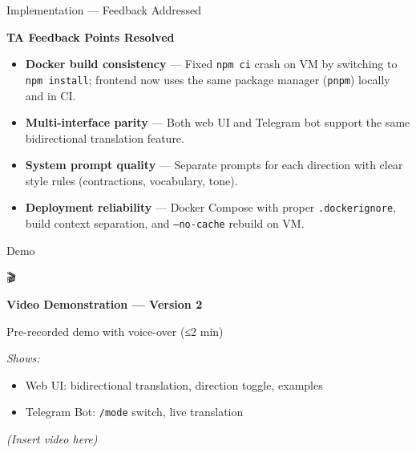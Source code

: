 \documentclass[11pt]{beamer}
\begin{document}
\begin{frame}{Implementation — Feedback Addressed}

    \textbf{TA Feedback Points Resolved}
    \begin{itemize}
        \item \textbf{Docker build consistency} — Fixed \texttt{npm ci} crash on VM by switching to \texttt{npm install}; frontend now uses the same package manager (\texttt{pnpm}) locally and in CI.
        \item \textbf{Multi-interface parity} — Both web UI and Telegram bot support the same bidirectional translation feature.
        \item \textbf{System prompt quality} — Separate prompts for each direction with clear style rules (contractions, vocabulary, tone).
        \item \textbf{Deployment reliability} — Docker Compose with proper \texttt{.dockerignore}, build context separation, and \texttt{--no-cache} rebuild on VM.
    \end{itemize}

\end{frame}

\begin{frame}{Demo}

    \begin{center}
        \vspace{1cm}
        {\Huge 🎬}

        \vspace{0.5cm}
        \textbf{\Large Video Demonstration — Version 2}

        \vspace{0.5cm}
        \footnotesize Pre-recorded demo with voice-over (≤2 min)

        \vspace{0.3cm}
        \textit{Shows:}
        \begin{itemize}
            \item Web UI: bidirectional translation, direction toggle, examples
            \item Telegram Bot: \texttt{/mode} switch, live translation
        \end{itemize}

        \vspace{0.5cm}
        {\small \textit{(Insert video here)}}
    \end{center}

\end{frame}
\end{document}

